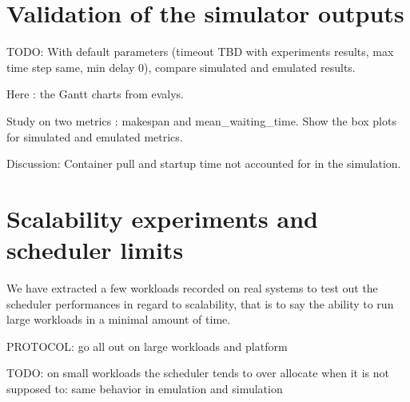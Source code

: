 \documentclass[12pt, a4paper]{memoir}
\begin{document}
\section{Validation of the simulator outputs}

TODO: With default parameters (timeout TBD with experiments results, max time step same, min delay 0), compare simulated and emulated results. 

Here : the Gantt charts from evalys.

Study on two metrics : makespan and mean\_waiting\_time. Show the box plots for
simulated and emulated metrics.

Discussion:
Container pull and startup time not accounted for in the simulation.

\section{Scalability experiments and scheduler limits}

We have extracted a few workloads recorded on real systems to test out the
scheduler performances in regard to scalability, that is to say the ability to
run large workloads in a minimal amount of time.

PROTOCOL: go all out on large workloads and platform

TODO: on small workloads the scheduler tends to over allocate when it is not supposed
to: same behavior in emulation and simulation

\backmatter
\printbibliography
\end{document}
